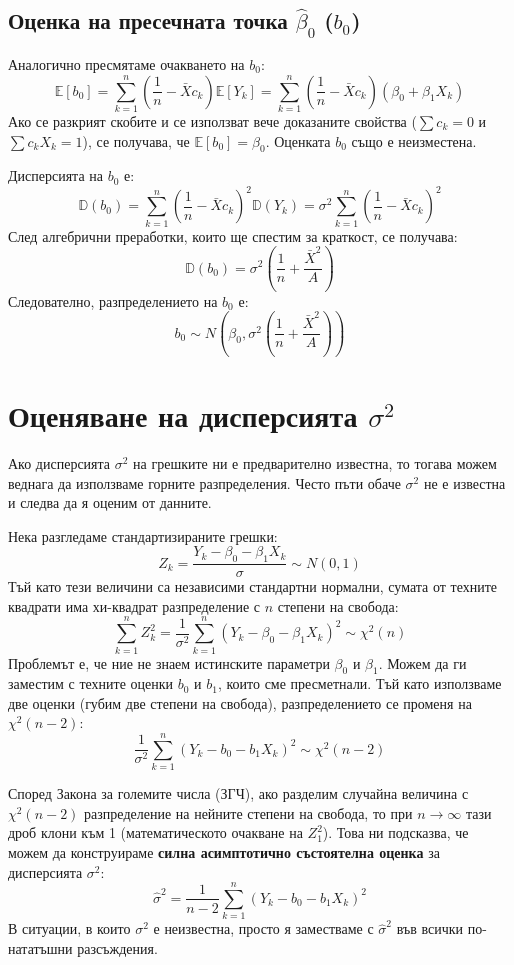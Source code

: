 \documentclass{article}
\begin{document}
\subsection{Оценка на пресечната точка $\hat{\beta}_0$ ($b_0$)}
Аналогично пресмятаме очакването на $b_0$:
\[
\mathbb{E}[b_0] = \sum_{k=1}^n \left( \frac{1}{n} - \bar{X} c_k \right) \mathbb{E}[Y_k] = \sum_{k=1}^n \left( \frac{1}{n} - \bar{X} c_k \right) (\beta_0 + \beta_1 X_k)
\]
Ако се разкрият скобите и се използват вече доказаните свойства ($\sum c_k = 0$ и $\sum c_k X_k = 1$), се получава, че $\mathbb{E}[b_0] = \beta_0$. Оценката $b_0$ също е неизместена.

Дисперсията на $b_0$ е:
\[
\mathbb{D}(b_0) = \sum_{k=1}^n \left( \frac{1}{n} - \bar{X} c_k \right)^2 \mathbb{D}(Y_k) = \sigma^2 \sum_{k=1}^n \left( \frac{1}{n} - \bar{X} c_k \right)^2
\]
След алгебрични преработки, които ще спестим за краткост, се получава:
\[
\mathbb{D}(b_0) = \sigma^2 \left( \frac{1}{n} + \frac{\bar{X}^2}{A} \right)
\]
Следователно, разпределението на $b_0$ е:
\[
b_0 \sim N\left(\beta_0, \sigma^2 \left(\frac{1}{n} + \frac{\bar{X}^2}{A}\right)\right)
\]

\section{Оценяване на дисперсията $\sigma^2$}

Ако дисперсията $\sigma^2$ на грешките ни е предварително известна, то тогава можем веднага да използваме горните разпределения. Често пъти обаче $\sigma^2$ не е известна и следва да я оценим от данните.

Нека разгледаме стандартизираните грешки:
\[
Z_k = \frac{Y_k - \beta_0 - \beta_1 X_k}{\sigma} \sim N(0, 1)
\]
Тъй като тези величини са независими стандартни нормални, сумата от техните квадрати има хи-квадрат разпределение с $n$ степени на свобода:
\[
\sum_{k=1}^n Z_k^2 = \frac{1}{\sigma^2} \sum_{k=1}^n (Y_k - \beta_0 - \beta_1 X_k)^2 \sim \chi^2(n)
\]
Проблемът е, че ние не знаем истинските параметри $\beta_0$ и $\beta_1$. Можем да ги заместим с техните оценки $b_0$ и $b_1$, които сме пресметнали. Тъй като използваме две оценки (губим две степени на свобода), разпределението се променя на $\chi^2(n-2)$:
\[
\frac{1}{\sigma^2} \sum_{k=1}^n (Y_k - b_0 - b_1 X_k)^2 \sim \chi^2(n-2)
\]

Според Закона за големите числа (ЗГЧ), ако разделим случайна величина с $\chi^2(n-2)$ разпределение на нейните степени на свобода, то при $n \to \infty$ тази дроб клони към 1 (математическото очакване на $Z_1^2$). Това ни подсказва, че можем да конструираме \textbf{силна асимптотично състоятелна оценка} за дисперсията $\sigma^2$:
\[
\hat{\sigma}^2 = \frac{1}{n-2} \sum_{k=1}^n (Y_k - b_0 - b_1 X_k)^2
\]
В ситуации, в които $\sigma^2$ е неизвестна, просто я заместваме с $\hat{\sigma}^2$ във всички по-нататъшни разсъждения.
\end{document}
